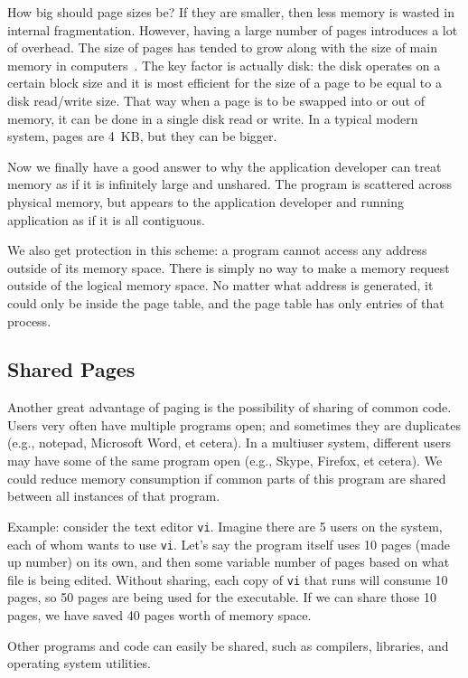 How big should page sizes be? If they are smaller, then less memory is wasted in internal fragmentation. However, having a large number of pages introduces a lot of overhead. The size of pages has tended to grow along with the size of main memory in computers~\cite{osc}. The key factor is actually disk: the disk operates on a certain block size and it is most efficient for the size of a page to be equal to a disk read/write size. That way when a page is to be swapped into or out of memory, it can be done in a single disk read or write. In a typical modern system, pages are 4~KB, but they can be bigger.

Now we finally have a good answer to why the application developer can treat memory as if it is infinitely large and unshared. The program is scattered across physical memory, but appears to the application developer and running application as if it is all contiguous. 

We also get protection in this scheme: a program cannot access any address outside of its memory space. There is simply no way to make a memory request outside of the logical memory space. No matter what address is generated, it could only be inside the page table, and the page table has only entries of that process.


\subsection*{Shared Pages}

Another great advantage of paging is the possibility of sharing of common code. Users very often have multiple programs open; and sometimes they are duplicates (e.g., notepad, Microsoft Word, et cetera). In a multiuser system, different users may have some of the same program open (e.g., Skype, Firefox, et cetera). We could reduce memory consumption if common parts of this program are shared between all instances of that program.

Example: consider the text editor \texttt{vi}. Imagine there are 5 users on the system, each of whom wants to use \texttt{vi}. Let's say the program itself uses 10 pages (made up number) on its own, and then some variable number of pages based on what file is being edited. Without sharing, each copy of \texttt{vi} that runs will consume 10 pages, so 50 pages are being used for the executable. If we can share those 10 pages, we have saved 40 pages worth of memory space.

Other programs and code can easily be shared, such as compilers, libraries, and operating system utilities.

